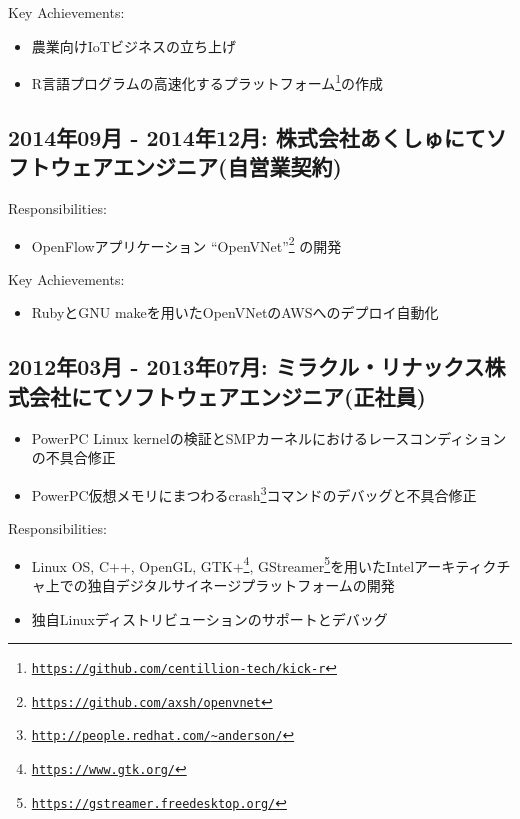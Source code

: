 \documentclass[letterpaper]{article}
\begin{document}
Key Achievements:

\begin{itemize}
  \item 農業向けIoTビジネスの立ち上げ
  \item R言語プログラムの高速化するプラットフォーム\footnote{\href{https://github.com/centillion-tech/kick-r}{\tt https://github.com/centillion-tech/kick-r}}の作成
\end{itemize}

\subsection*{2014年09月 - 2014年12月: 株式会社あくしゅにてソフトウェアエンジニア(自営業契約)}

Responsibilities:

\begin{itemize}
  \item OpenFlowアプリケーション ``OpenVNet''\footnote{\href{https://github.com/axsh/openvnet}{\tt https://github.com/axsh/openvnet}} の開発
\end{itemize}

Key Achievements:

\begin{itemize}
  \item RubyとGNU makeを用いたOpenVNetのAWSへのデプロイ自動化
\end{itemize}

\subsection*{2012年03月 - 2013年07月: ミラクル・リナックス株式会社にてソフトウェアエンジニア(正社員)}

\begin{itemize}
  \item PowerPC Linux kernelの検証とSMPカーネルにおけるレースコンディションの不具合修正
  \item PowerPC仮想メモリにまつわるcrash\footnote{\href{http://people.redhat.com/{\textasciitilde}anderson/}{\tt http://people.redhat.com/{\textasciitilde}anderson/}}コマンドのデバッグと不具合修正
\end{itemize}

Responsibilities:

\begin{itemize}
  \item Linux OS, C++, OpenGL, GTK+\footnote{\href{https://www.gtk.org/}{\tt https://www.gtk.org/}}, GStreamer\footnote{\href{https://gstreamer.freedesktop.org/}{\tt https://gstreamer.freedesktop.org/}}を用いたIntelアーキティクチャ上での独自デジタルサイネージプラットフォームの開発
  \item 独自Linuxディストリビューションのサポートとデバッグ
\end{itemize}
\end{document}
